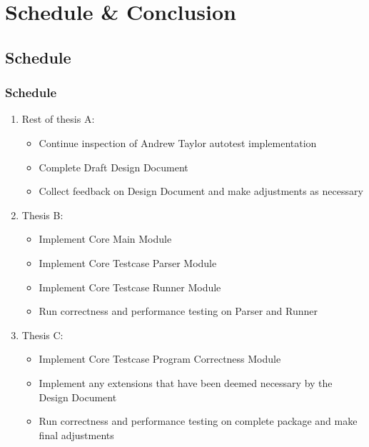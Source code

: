 \documentclass[xcolor]{beamer}
\begin{document}
\section{Schedule \& Conclusion}
\subsection{Schedule}
\begin{frame}
	\frametitle{Schedule}
	\begin{enumerate}
		\item Rest of thesis A:
		\begin{itemize}
			\item Continue inspection of Andrew Taylor autotest implementation
				\pause
			\item Complete Draft Design Document
				\pause
			\item Collect feedback on Design Document and make adjustments as necessary
				\pause 
		\end{itemize}
		\item Thesis B:
		\begin{itemize}
			\item Implement Core Main Module
				\pause
			\item Implement Core Testcase Parser Module
				\pause
			\item Implement Core Testcase Runner Module
				\pause
			\item Run correctness and performance testing on Parser and Runner
				\pause
		\end{itemize}
		\item Thesis C:
		\begin{itemize}
			\item Implement Core Testcase Program Correctness Module
				\pause
			\item Implement any extensions that have been deemed necessary by the Design Document
				\pause
			\item Run correctness and performance testing on complete package and make final adjustments
		\end{itemize}
	\end{enumerate}
\end{frame}
\end{document}
